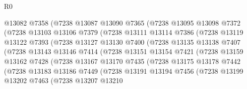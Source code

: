 \begin{lexlean}{R0}
\begin{coremodule}
                  @13082
                  @7358
                  (@7238
                    @13087
                    @13090
                    @7365
                    (@7238
                      @13095
                      @13098
                      @7372
                      (@7238
                        @13103
                        @13106
                        @7379
                        (@7238
                          @13111
                          @13114
                          @7386
                          (@7238
                            @13119
                            @13122
                            @7393
                            (@7238
                              @13127
                              @13130
                              @7400
                              (@7238
                                @13135
                                @13138
                                @7407
                                (@7238
                                  @13143
                                  @13146
                                  @7414
                                  (@7238
                                    @13151
                                    @13154
                                    @7421
                                    (@7238
                                      @13159
                                      @13162
                                      @7428
                                      (@7238
                                        @13167
                                        @13170
                                        @7435
                                        (@7238
                                          @13175
                                          @13178
                                          @7442
                                          (@7238
                                            @13183
                                            @13186
                                            @7449
                                            (@7238
                                              @13191
                                              @13194
                                              @7456
                                              (@7238
                                                @13199
                                                @13202
                                                @7463
                                                (@7238
                                                  @13207
                                                  @13210

\end{coremodule}
\end{lexlean}
